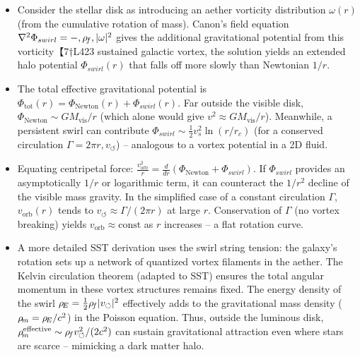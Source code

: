 \documentclass[11pt]{article}
\begin{document}
\begin{itemize}

\item 
Consider the stellar disk as introducing an aether vorticity distribution $\omega(r)$ (from the cumulative rotation of mass). Canon’s field equation $\nabla^2 \Phi_{swirl} = -,\rho_{\!f},|\omega|^2$ gives the additional gravitational potential from this vorticity【7†L423 sustained galactic vortex, the solution yields an extended halo potential $\Phi_{swirl}(r)$ that falls off more slowly than Newtonian $1/r$.




\item 
The total effective gravitational potential is $ \Phi_{\text{tot}}(r) = \Phi_{\text{Newton}}(r) + \Phi_{swirl}(r)$. Far outside the visible disk, $\Phi_{\text{Newton}} \sim GM_{\text{vis}}/r$ (which alone would give $v^2 \approx GM_{\text{vis}}/r$). Meanwhile, a persistent swirl can contribute $\Phi_{swirl} \sim \frac{1}{2}v_s^2 \ln(r/r_c)$ (for a conserved circulation $\Gamma = 2\pi r,v_{\circlearrowleft}$) – analogous to a vortex potential in a 2D fluid.




\item 
Equating centripetal force: $ \frac{v_{\text{orb}}^2}{r} = \frac{d}{dr}(\Phi_{\text{Newton}} + \Phi_{swirl})$. If $\Phi_{swirl}$ provides an asymptotically $1/r$ or logarithmic term, it can counteract the $1/r^2$ decline of the visible mass gravity. In the simplified case of a constant circulation $\Gamma$, $v_{\text{orb}}(r)$ tends to $v_{\circlearrowleft} \approx \Gamma/(2\pi r)$ at large $r$. Conservation of $\Gamma$ (no vortex breaking) yields $v_{\text{orb}} \approx \text{const}$ as $r$ increases – a flat rotation curve.




\item 
A more detailed SST derivation uses the swirl string tension: the galaxy’s rotation sets up a network of quantized vortex filaments in the aether. The Kelvin circulation theorem (adapted to SST) ensures the total angular momentum in these vortex structures remains fixed. The energy density of the swirl $\rho_{\!E} = \frac{1}{2}\rho_{\!f} |v_{\circlearrowleft}|^2$ effectively adds to the gravitational mass density ($\rho_{\!m} = \rho_{\!E}/c^2$) in the Poisson equation. Thus, outside the luminous disk, $\rho_{\!m}^{\text{effective}} \sim \rho_{\!f} v_{\circlearrowleft}^2/(2c^2)$ can sustain gravitational attraction even where stars are scarce – mimicking a dark matter halo.





\end{itemize}
\end{document}
